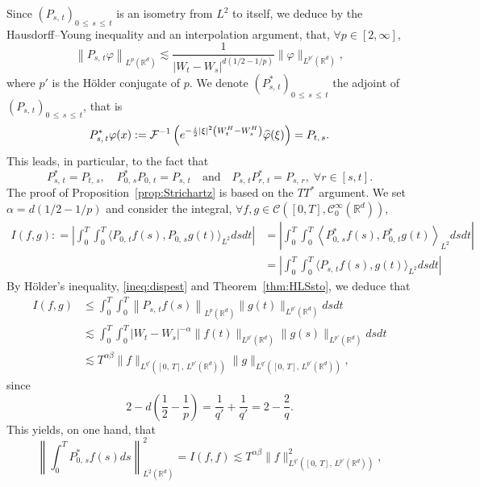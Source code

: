 \documentclass[AHL,Unicode,longabstracts,published]{cedram}
\newcommand{\bbR}{\mathbb{R}}
\newcommand{\clC}{\mathcal{C}}
\newcommand{\clF}{\mathcal{F}}
\let\oldhat\hat
\renewcommand*{\hat}[1]{\mathchoice{\widehat{#1}}{\widehat{#1}}{\oldhat{#1}}{\oldhat{#1}}}
\let\oldforall\forall
\renewcommand*{\forall}{\mathrel{\oldforall}}
\begin{document}
Since $(P_{s,\,t})_{0\,\leq\,s\,\leq\,t}$ is an isometry from $L^2$ to itself, we deduce by the Hausdorff--Young inequality and an interpolation argument, that, $\forall p\in [2,\infty]$,
\begin{equation}\label{ineq:dispest}
\left\|P_{s,\,t}\varphi\right\|_{L^p\left(\bbR^d\right)} \lesssim \frac{1}{\left|W_t-W_s\right|^{d\left(1/2-1/p\right)}} \|\varphi\|_{L^{p'}\left(\bbR^d\right)},
\end{equation}
where $p'$ is the H\"older conjugate of $p$. We denote $(P_{s,\,t}^*)_{0\,\leq\,s\,\leq\,t}$ the adjoint of $(P_{s,\,t})_{0\,\leq\,s\,\leq\,t}$, that is
\[
P^*_{s,\,t}\varphi(x) : = \clF^{-1}\left(e^{-\frac{i}2 |\xi|^2\left(W_t^H-W_s^H\right)} \hat{\varphi}(\xi)\right) = P_{t,\,s}.
\]
This leads, in particular, to the fact that
\[
P^*_{s,\,t} = P_{t,\,s},\quad P_{0,\,s}^*P_{0,\,t} = P_{s,\,t}\quad\text{and}\quad P_{s,\,t}P^*_{r,\,t} = P_{s,\,r},\; \forall r\in[s,t].
\]
The proof of Proposition~\ref{prop:Strichartz} is based on the $TT^*$ argument. We set $\alpha = d(1/2-1/p)$ and consider the integral, $\forall f,g\in \clC([0,T], \clC^{\infty}_0(\bbR^d))$,
\begin{align*}
I(f,g) : = \left| \int_0^T\int_0^T \big\langle P_{0,\,t} f(s), P_{0,\,s} g(t)\big\rangle_{L^2} ds dt \right| &= \left| \int_0^T\int_0^T \left\langle P_{0,\,s}^* f(s), P_{0,\,t}^*g(t)\right\rangle_{L^2} ds dt \right|
\\
&= \left| \int_0^T\int_0^T \big\langle P_{s,\,t} f(s), g(t)\big\rangle_{L^2} ds dt \right|
\end{align*}
By H\"older's inequality, \eqref{ineq:dispest} and Theorem~\ref{thm:HLSsto}, we deduce that
\begin{align*}
I(f,g) &\leq \int_0^T\int_0^T \left\|P_{s,\,t}f(s)\right\|_{L^{p}\left(\bbR^d\right)}\|g(t)\|_{L^{p'}\left(\bbR^d\right)} ds dt\\
&\lesssim\int_0^T\int_0^T \left|W_t-W_s\right|^{-\alpha}\|f(t)\|_{L^{p'}\left(\bbR^d\right)}\|g(s)\|_{L^{p'}\left(\bbR^d\right)} ds dt\\
&\lesssim T^{\alpha\beta} \|f\|_{L^{q'}\left([0,\,T],\,L^{p'}\left(\bbR^d\right)\right)}\|g\|_{L^{q'}\left([0,\,T],\,L^{p'}\left(\bbR^d\right)\right)},
\end{align*}
since
\[
2 - d\left(\frac12-\frac1p\right) = \frac 1{q'} + \frac1{q'} = 2 - \frac{2}{q}.
\]
This yields, on one hand, that
\begin{equation}\label{eq:StriHomoDual}
\left\|\int_0^T P_{0,\,s}^* f(s) ds \right\|_{L^2\left(\bbR^d\right)}^2 = I(f,f) \lesssim T^{\alpha\beta} \|f\|_{L^{q'}\left([0,\,T],\,L^{p'}\left(\bbR^d\right)\right)}^2,
\end{equation}
\end{document}
